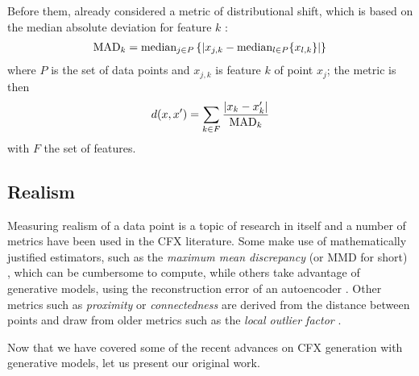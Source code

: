 \documentclass[../main.tex]{subfiles}
\begin{document}
Before them, \citeauthor{wachterCounterfactual2017} already considered a metric of distributional shift, which is based on the median absolute deviation for feature $k$ \cite{wachterCounterfactual2017}:
\begin{align*}
	\text{MAD}_k
	= \text{median}_{j \in P} \left\{
	\left\lvert
		x_{j,k} - \text{median}_{l \in P} \{ x_{l, k} \}
	\right\rvert
	\right\}
\end{align*}
where $P$ is the set of data points and $x_{j, k}$ is feature $k$ of point $x_j$; the metric is then
\begin{align*}
	d(x, x') = \sum_{k \in F} \frac{\left\lvert x_k - x'_k\right\rvert}{\text{MAD}_k}
\end{align*}
with $F$ the set of features.

\subsection{Realism}

Measuring realism of a data point is a topic of research in itself and a number of metrics have been used in the CFX literature.
Some make use of mathematically justified estimators, such as the \emph{maximum mean discrepancy} (or MMD for short) \cite{zhangInterpretable2022}, which can be cumbersome to compute, while others take advantage of generative models, \eg{} using the reconstruction error of an autoencoder \cite{vanlooverenInterpretable2021}.
Other metrics such as \emph{proximity} or \emph{connectedness} \cite{laugelIssues2019} are derived from the distance between points and draw from older metrics such as the \emph{local outlier factor} \cite{breunigLOF2000}.

Now that we have covered some of the recent advances on CFX generation with generative models, let us present our original work.
\end{document}
